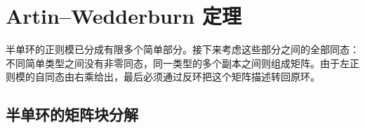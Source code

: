 
\section{Artin–Wedderburn 定理}
\label{b2:sec:1303}

半单环的正则模已分成有限多个简单部分。接下来考虑这些部分之间的全部同态：不同简单类型之间没有非零同态，同一类型的多个副本之间则组成矩阵。由于左正则模的自同态由右乘给出，最后必须通过反环把这个矩阵描述转回原环。

%
%

\subsection{半单环的矩阵块分解}
\label{b2:subsec:1303:01}

